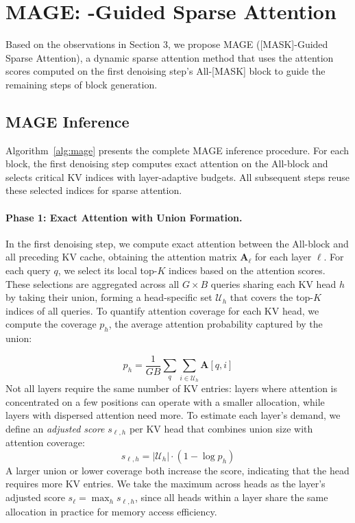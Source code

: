 \section{MAGE: \mask-Guided Sparse Attention}
\label{sec:method}





Based on the observations in Section 3, we propose MAGE ([MASK]-Guided Sparse Attention), a dynamic sparse attention method that uses the attention scores computed on the first denoising step's All-[MASK] block to guide the remaining steps of block generation.




\subsection{MAGE Inference}
\label{subsec:mage_inference}

Algorithm~\ref{alg:mage} presents the complete MAGE inference procedure. For each block, the first denoising step computes exact attention on the All-\mask block and selects critical KV indices with layer-adaptive budgets. All subsequent steps reuse these selected indices for sparse attention.



\paragraph{Phase 1: Exact Attention with Union Formation.}
In the first denoising step, we compute exact attention between the All-\mask block and all preceding KV cache, obtaining the attention matrix $\mathbf{A}_\ell$ for each layer $\ell$.
For each query $q$, we select its local top-$K$ indices based on the attention scores.
These selections are aggregated across all $G \times B$ queries sharing each KV head $h$ by taking their union, forming a head-specific set $\mathcal{U}_h$ that covers the top-$K$ indices of all queries.
To quantify attention coverage for each KV head, we compute the coverage $p_h$, the average attention probability captured by the union: 

\begin{equation}
p_h = \frac{1}{GB}\sum_{q} \sum_{i \in \mathcal{U}_h} \mathbf{A}[q, i]
\end{equation}
Not all layers require the same number of KV entries: layers where attention is concentrated on a few positions can operate with a smaller allocation, while layers with dispersed attention need more.
To estimate each layer's demand, we define an \textit{adjusted score} $s_{\ell,h}$ per KV head that combines union size with attention coverage:
\begin{equation}
s_{\ell,h} = |\mathcal{U}_h| \cdot (1 - \log p_h)
\end{equation}
A larger union or lower coverage both increase the score, indicating that the head requires more KV entries. We take the maximum across heads as the layer's adjusted score $s_\ell = \max_h s_{\ell,h}$, since all heads within a layer share the same allocation in practice for memory access efficiency.

